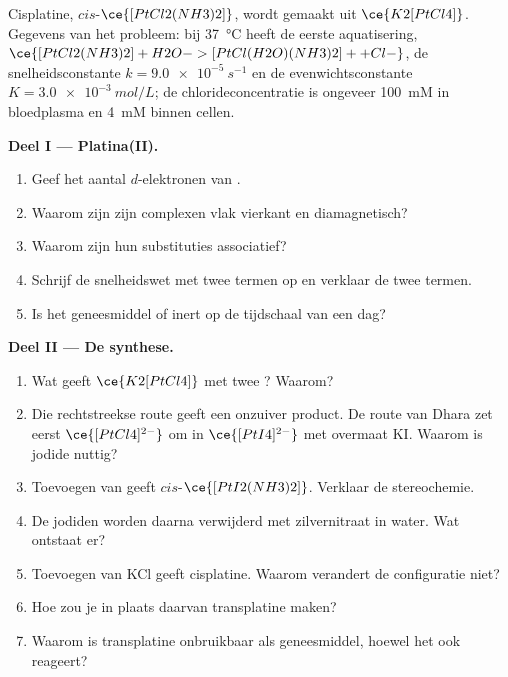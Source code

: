 \begin{problem}
\label{pb:b3:complex-mechanisms:1}
Cisplatine, $cis$-$\ce{[PtCl2(NH3)2]}$, wordt gemaakt uit $\ce{K2[PtCl4]}$. Gegevens van het probleem: bij
\qty{37}{\celsius} heeft de eerste aquatisering, $\ce{[PtCl2(NH3)2] + H2O -> [PtCl(H2O)(NH3)2]+ + Cl-}$, de
snelheidsconstante $k = \qty{9.0e-5}{s^{-1}}$ en de evenwichtsconstante $K = \qty{3.0e-3}{mol/L}$; de
chlorideconcentratie is ongeveer \qty{100}{mM} in bloedplasma en \qty{4}{mM} binnen cellen.

\medskip\noindent\textbf{Deel I --- Platina(II).}
\begin{enumerate}
  \item Geef het aantal $d$-elektronen van .
  \item Waarom zijn zijn complexen vlak vierkant en diamagnetisch?
  \item Waarom zijn hun substituties associatief?
  \item Schrijf de snelheidswet met twee termen op en verklaar de twee
        termen.
  \item Is het geneesmiddel  of inert op de tijdschaal van een dag?
\end{enumerate}

\medskip\noindent\textbf{Deel II --- De synthese.}
\begin{enumerate}[resume]
  \item Wat geeft $\ce{K2[PtCl4]}$ met twee ? Waarom?
  \item Die rechtstreekse route geeft een onzuiver product. De route van
        Dhara zet eerst
        $\ce{[PtCl4]^{2-}}$ om in $\ce{[PtI4]^{2-}}$ met overmaat KI. Waarom is jodide nuttig?
  \item Toevoegen van  geeft $cis$-$\ce{[PtI2(NH3)2]}$. Verklaar de stereochemie.
  \item De jodiden worden daarna verwijderd met zilvernitraat in water.
        Wat ontstaat er?
  \item Toevoegen van KCl geeft cisplatine. Waarom verandert de
        configuratie niet?
  \item Hoe zou je in plaats daarvan transplatine maken?
  \item Waarom is transplatine onbruikbaar als geneesmiddel, hoewel het
        ook reageert?
\end{enumerate}


\end{problem}
